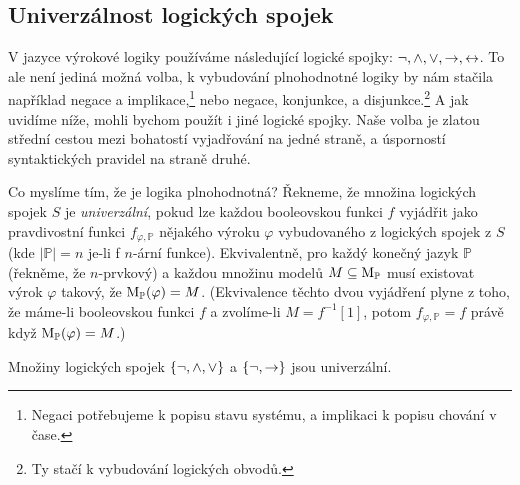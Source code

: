 \subsection{Univerzálnost logických spojek}

V jazyce výrokové logiky používáme následující logické spojky: $\neg, {\land},{\lor},{\mathbin{\rightarrow}},{\mathbin{\leftrightarrow}}$. To ale není jediná možná volba, k vybudování plnohodnotné logiky by nám stačila například negace a implikace,\footnote{Negaci potřebujeme k popisu stavu systému, a implikaci k popisu chování v čase.} nebo negace, konjunkce, a disjunkce.\footnote{Ty stačí k vybudování logických obvodů.} A jak uvidíme níže, mohli bychom použít i jiné logické spojky. Naše volba je zlatou střední cestou mezi bohatostí vyjadřování na jedné straně, a úsporností syntaktických pravidel na straně druhé.

Co myslíme tím, že je logika plnohodnotná?
Řekneme, že množina logických spojek $S$ je \emph{univerzální}, pokud lze každou booleovskou funkci $f$ vyjádřit jako pravdivostní funkci $f_{\varphi,\mathbb P}$ nějakého výroku $\varphi$ vybudovaného z logických spojek z $S$ (kde $|\mathbb P|=n$ je-li f $n$-ární funkce). Ekvivalentně, pro každý konečný jazyk $\mathbb P$ (řekněme, že $n$-prvkový) a každou množinu modelů $M\subseteq \operatorname{M}_\mathbb P$ musí existovat výrok $\varphi$ takový, že $\operatorname{M}_\mathbb P(\varphi)=M$. (Ekvivalence těchto dvou vyjádření plyne z toho, že máme-li booleovskou funkci $f$ a zvolíme-li $M=f^{-1}[1]$, potom $f_{\varphi,\mathbb P}=f$ právě když $\operatorname{M}_\mathbb P(\varphi)=M$.)

\begin{proposition} \label{proposition:not-and-or-is-universal}
    Množiny logických spojek $\{\neg, {\land},{\lor}\}$ a $\{\neg, {\mathbin{\rightarrow}}\}$ jsou univerzální.
\end{proposition}


